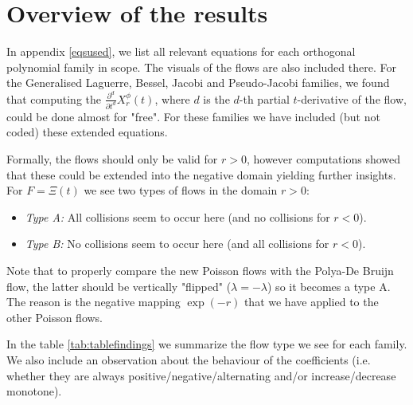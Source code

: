 \documentclass[a4paper,11pt,twoside]{amsart}
\begin{document}
\section{Overview of the results} \label{results}
In appendix \ref{eqsused}, we list all relevant equations for each orthogonal polynomial family in scope. The visuals of the flows are also included there. For the Generalised Laguerre, Bessel, Jacobi and Pseudo-Jacobi families, we found that computing the $\frac{\partial^{d}}{\partial t^{d}} X^{\mathcal{\phi}}_r(t)$, where $d$ is the $d$-th partial $t$-derivative of the flow, could be done almost for "free". For these families we have included (but not coded) these extended equations.  

Formally, the flows should only be valid for $r > 0$, however computations showed that these could be extended into the negative domain yielding further insights. For $F=\Xi(t)$ we see two types of flows in the domain $r > 0$:
\begin{itemize}
  \item \textit{Type A:} All collisions seem to occur here (and no collisions for $r < 0$).
  \item \textit{Type B:} No collisions seem to occur here (and all collisions for $r < 0$).
\end{itemize}

Note that to properly compare the new Poisson flows with the Polya-De Bruijn flow, the latter should be vertically "flipped" ($\lambda = -\lambda$) so it becomes a type A. The reason is the negative mapping $\exp(-r)$ that we have applied to the other Poisson flows. 

In the table \ref{tab:tablefindings} we summarize the flow type we see for each family. We also include an observation about the behaviour of the coefficients (i.e. whether they are always positive/negative/alternating and/or increase/decrease monotone).
\end{document}

